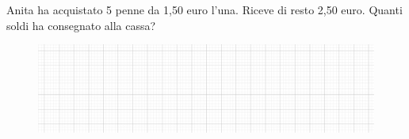 \item Anita ha acquistato 5 penne da 1,50 euro l'una. Riceve di resto 2,50 euro. Quanti soldi ha consegnato alla cassa?
\begin{figure}[h]
	\centering
		\includegraphics[width=13cm]{figure/quadretti.png}
\end{figure}
